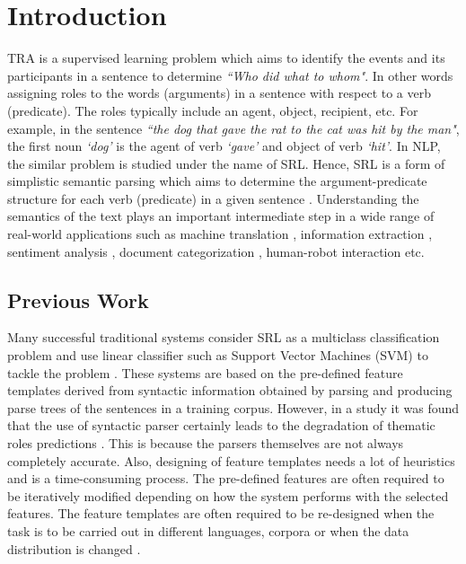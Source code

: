 \chapter{Introduction}\label{introduction}

\ac{TRA} is a supervised learning problem which aims to identify the events and its participants in a sentence to determine \textit{``Who did what to whom"}. In other words assigning roles to the words (arguments) in a sentence with respect to a verb (predicate). The roles typically include an agent, object, recipient, etc. For example, in the sentence \textit{``the dog that gave the rat to the cat was hit by the man"}, the first noun \textit{`dog'} is the agent of verb \textit{`gave'} and object of verb \textit{`hit'}. In \ac{NLP}, the similar problem is studied under the name of \ac{SRL}. Hence, SRL is a form of simplistic semantic parsing which aims to determine the argument-predicate structure for each verb (predicate) in a given sentence \cite{end-to-end}. Understanding the semantics of the text plays an important intermediate step in a wide range of real-world applications such as machine translation \cite{srl:machine_translation}, information extraction \cite{srl:info_extraction:hri}, sentiment analysis \cite{srl:sentiment:wang}, document categorization \cite{srl:text_categorization:persson}, human-robot interaction \cite{tra:xavier_hri,srl:info_extraction:hri} etc.

\section{Previous Work}

Many successful traditional systems consider \acs{SRL} as a multiclass classification problem and use linear classifier such as Support Vector Machines (SVM) to tackle the problem \cite{Koomen:2005,srl:pradhan:2004,pradhan:2005}. These systems are based on the pre-defined feature templates derived from syntactic information obtained by parsing and producing parse trees of the sentences in a training corpus. However, in a study it was found that the use of syntactic parser certainly leads to the degradation of thematic roles predictions \cite{pradhan:2005}. This is because the parsers themselves are not always completely accurate.  Also, designing of feature templates needs a lot of heuristics and is a time-consuming process. The pre-defined features are often required to be iteratively modified depending on how the system performs with the selected features. The feature templates are often required to be re-designed when the task is to be carried out in different languages, corpora or when the data distribution is changed \cite{end-to-end}.

